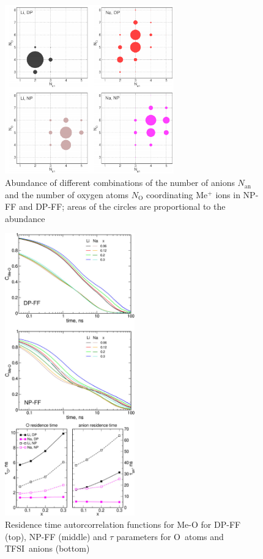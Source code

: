 \begin{figure}[H]
    \centering
    \includegraphics[width=0.65\textwidth]{img/3-structural-data-from-md-simulations/2-li-na/fig2.png}
    \caption{Abundance of different combinations of the number of anions $N_{\text{an}}$ and the number of oxygen atoms $N_{\text{O}}$ coordinating Me$^{+}$ ions in NP-FF and DP-FF; areas of the circles are proportional to the abundance}
    \label{fig:li-na-fig-2}
\end{figure}

\begin{figure}[ht]
    \centering
    \includegraphics[width=0.5\textwidth]{img/3-structural-data-from-md-simulations/2-li-na/fig4.png}
    \caption{Residence time autorcorrelation functions for Me-O for DP-FF (top), NP-FF (middle) and $\tau$ parameters for O~atoms and TFSI~anions (bottom)}
    \label{fig:li-na-fig-4}
\end{figure}

